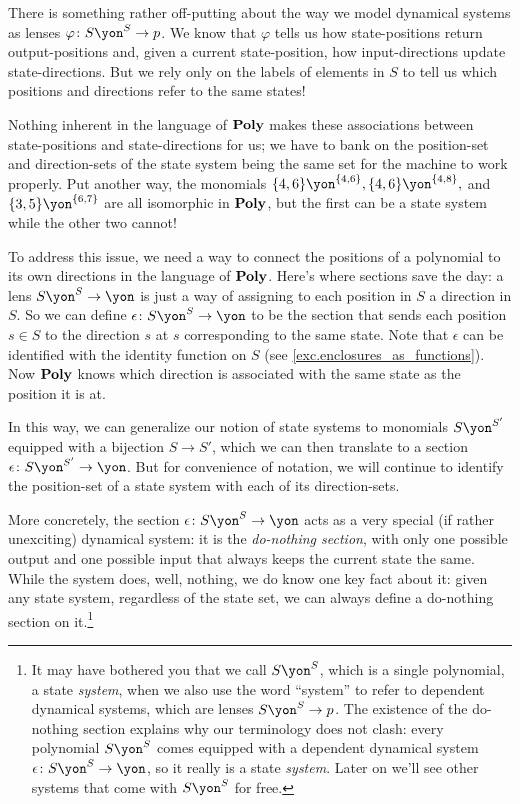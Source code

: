 \documentclass[Book-Poly]{subfiles}
\begin{document}
\begin{example} \label{ex.do_nothing}
There is something rather off-putting about the way we model dynamical systems as lenses $\varphi\colon S\yon^S\to p$.
We know that $\varphi$ tells us how state-positions return output-positions and, given a current state-position, how input-directions update state-directions.
But we rely only on the labels of elements in $S$ to tell us which positions and directions refer to the same states!

Nothing inherent in the language of $\mathbf{Poly}$ makes these associations between state-positions and state-directions for us; we have to bank on the position-set and direction-sets of the state system being the same set for the machine to work properly.
Put another way, the monomials $\{4,6\}\yon^{\{4,6\}},\{4,6\}\yon^{\{4,8\}},$ and $\{3,5\}\yon^{\{6,7\}}$ are all isomorphic in $\mathbf{Poly}$, but the first can be a state system while the other two cannot!

To address this issue, we need a way to connect the positions of a polynomial to its own directions in the language of $\mathbf{Poly}$.
Here's where sections save the day: a lens $S\yon^S\to\yon$ is just a way of assigning to each position in $S$ a direction in $S$.
So we can define $\epsilon\colon S\yon^S\to\yon$ to be the section that sends each position $s\in S$ to the direction $s$ at $s$ corresponding to the same state.
Note that $\epsilon$ can be identified with the identity function on $S$ (see \cref{exc.enclosures_as_functions}).
Now $\mathbf{Poly}$ knows which direction is associated with the same state as the position it is at.

In this way, we can generalize our notion of state systems to monomials $S\yon^{S'}$ equipped with a bijection $S\to S'$, which we can then translate to a section $\epsilon\colon S\yon^{S'}\to\yon$.
But for convenience of notation, we will continue to identify the position-set of a state system with each of its direction-sets.

More concretely, the section $\epsilon\colon S\yon^S\to\yon$ acts as a very special (if rather unexciting) dynamical system: it is the \emph{do-nothing section}, with only one possible output and one possible input that always keeps the current state the same.
While the system does, well, nothing, we do know one key fact about it: given any state system, regardless of the state set, we can always define a do-nothing section on it.\footnote{It may have bothered you that we call $S\yon^S$, which is a single polynomial, a state \emph{system}, when we also use the word ``system'' to refer to dependent dynamical systems, which are lenses $S\yon^S\to p$.
The existence of the do-nothing section explains why our terminology does not clash: every polynomial $S\yon^S$ comes equipped with a dependent dynamical system $\epsilon\colon S\yon^S\to\yon$, so it really is a state \emph{system}.
Later on we'll see other systems that come with $S\yon^S$ for free.}


\end{example}
\end{document}
